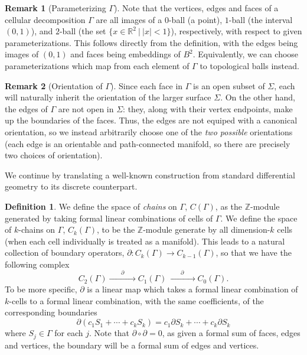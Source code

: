 \documentclass[aps,pra,showpacs,notitlepage,onecolumn,superscriptaddress,nofootinbib]{revtex4-1}
\theoremstyle{definition}
\newtheorem{definition}{Definition}[section]
\newtheorem{remark}{Remark}[section]
\begin{document}
\begin{remark}[Parameterizing $\Gamma$]
  Note that the vertices, edges and faces of a cellular decomposition $\Gamma$ are all images of a $0$-ball (a point), $1$-ball (the interval $(0, 1)$), and $2$-ball (the set $\{x \in \mathbb{R}^2 \ | \ |x| < 1\}$), respectively,
  with respect to given parameterizations. This follows directly from the definition, with the edges being images of $(0, 1)$ and faces being embeddings of $B^2$. Equivalently, we can choose parameterizations which map from each element
  of $\Gamma$ to topological balls instead.
\end{remark}

\begin{remark}[Orientation of $\Gamma$]
Since each face in $\Gamma$ is an open subset of $\Sigma$, each will naturally inherit the orientation of the larger surface $\Sigma$. On the other hand, the edges of $\Gamma$
are not open in $\Sigma$: they, along with their vertex endpoints, make up the boundaries of the faces. Thus, the edges are not equiped with a canonical orientation, so
we instead arbitrarily choose one of the \emph{two possible} orientations (each edge is an orientable and path-connected manifold, so there are precisely two choices of orientation).
\end{remark}

\noindent We continue by translating a well-known construction from standard differential geometry to its discrete counterpart.

\begin{definition}
  We define the space of \emph{chains} on $\Gamma$, $C(\Gamma)$, as the $\mathbb{Z}$-module generated by taking formal linear combinations of cells of $\Gamma$.
  We define the space of $k$-chains on $\Gamma$, $C_k(\Gamma)$, to be the $\mathbb{Z}$-module generate by all dimension-$k$ cells (when each cell individually is treated as a manifold).
  This leads to a natural collection of boundary operators, $\partial : C_k(\Gamma) \rightarrow C_{k - 1}(\Gamma)$, so that we have the following complex
  \begin{equation}
    C_2(\Gamma) \xrightarrow{\qquad \partial \qquad} C_1(\Gamma) \xrightarrow{\qquad \partial \qquad} C_0(\Gamma).
  \end{equation}
  To be more specific, $\partial$ is a linear map which takes a formal linear combination of $k$-cells to a formal linear combination, with the same
  coefficients, of the corresponding boundaries
  \begin{equation}
    \partial (c_1 S_1 + \cdots + c_k S_k) = c_1 \partial S_k + \cdots + c_k \partial S_k
  \end{equation}
  where $S_j \in \Gamma$ for each $j$. Note that $\partial \circ \partial = 0$, as given a formal sum of faces, edges and vertices, the
  boundary will be a formal sum of edges and vertices.
\end{definition}
\end{document}
